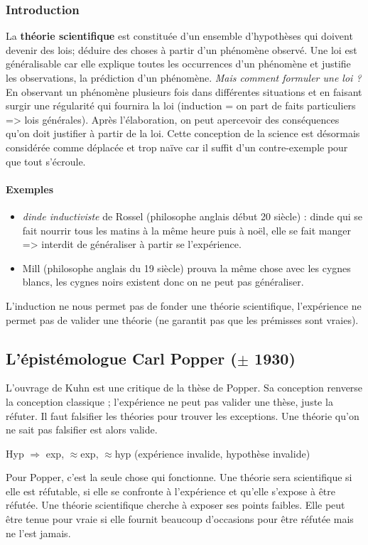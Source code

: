 \subsubsection{Introduction}
La \textbf{théorie scientifique} est constituée d'un ensemble d'hypothèses qui doivent devenir des lois; déduire des choses à partir d'un phénomène observé.
Une loi est généralisable car elle explique toutes les occurrences d'un phénomène et justifie les observations, la prédiction d'un phénomène.
\emph{Mais comment formuler une loi ?} En observant un phénomène plusieurs fois dans différentes situations et en faisant surgir une régularité qui fournira la loi (induction = on part de faits particuliers => lois générales).
Après l'élaboration, on peut apercevoir des conséquences qu'on doit justifier à partir de la loi.
Cette conception de la science est désormais considérée comme déplacée et trop naïve car il suffit d'un contre-exemple pour que tout s'écroule.
\paragraph{Exemples}
\begin{itemize}
	\item \emph{dinde inductiviste} de Rossel (philosophe anglais début 20\ieme{} siècle) : dinde qui se fait nourrir tous les matins à la même heure puis à noël, elle se fait manger => interdit de généraliser à partir se l'expérience.
	\item Mill (philosophe anglais du 19\ieme{} siècle) prouva la même chose avec les cygnes blancs, les cygnes noirs existent donc on ne peut pas généraliser.
\end{itemize}
L'induction ne nous permet pas de fonder une théorie scientifique, l'expérience ne permet pas de valider une théorie (ne garantit pas que les prémisses sont vraies).
\subsection{L'épistémologue Carl Popper ($\pm$ 1930)}
L'ouvrage de Kuhn est une critique de la thèse de Popper.
Sa conception renverse la conception classique ; l'expérience ne peut pas valider une thèse, juste la réfuter.
Il faut falsifier les théories pour trouver les exceptions.
Une théorie qu'on ne sait pas falsifier est alors valide.

Hyp $\Rightarrow$ exp, $\approx$exp, $\approx$hyp (expérience invalide, hypothèse invalide)

Pour Popper, c'est la seule chose qui fonctionne.
Une théorie sera scientifique si elle est réfutable, si elle se confronte à l'expérience et qu'elle s'expose à être réfutée.
Une théorie scientifique cherche à exposer ses points faibles.
Elle peut être tenue pour vraie si elle fournit beaucoup d'occasions pour être réfutée mais ne l'est jamais.
